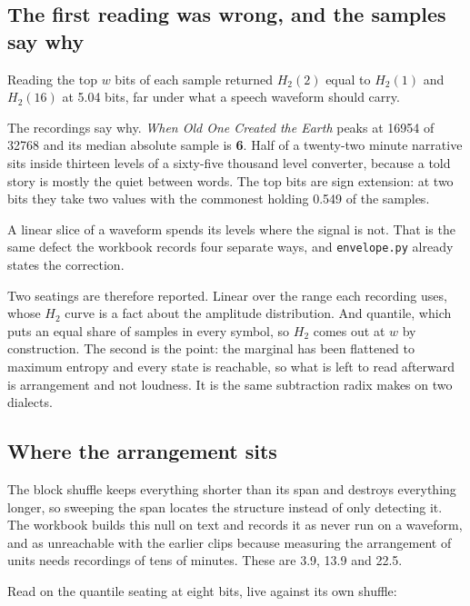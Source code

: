\subsection{The first reading was wrong, and the samples say why}

Reading the top \(w\) bits of each sample returned \(H_2(2)\) equal to \(H_2(1)\) and \(H_2(16)\) at
5.04 bits, far under what a speech waveform should carry.

The recordings say why. \emph{When Old One Created the Earth} peaks at 16954 of 32768 and its median
absolute sample is \textbf{6}. Half of a twenty-two minute narrative sits inside thirteen levels of a
sixty-five thousand level converter, because a told story is mostly the quiet between words. The top
bits are sign extension: at two bits they take two values with the commonest holding 0.549 of the
samples.

A linear slice of a waveform spends its levels where the signal is not. That is the same defect the
workbook records four separate ways, and \texttt{envelope.\allowbreak{}py} already states the
correction.

Two seatings are therefore reported. Linear over the range each recording uses, whose \(H_2\) curve
is a fact about the amplitude distribution. And quantile, which puts an equal share of samples in
every symbol, so \(H_2\) comes out at \(w\) by construction. The second is the point: the marginal
has been flattened to maximum entropy and every state is reachable, so what is left to read
afterward is arrangement and not loudness. It is the same subtraction radix makes on two dialects.

\subsection{Where the arrangement sits}

The block shuffle keeps everything shorter than its span and destroys everything longer, so sweeping
the span locates the structure instead of only detecting it. The workbook builds this null on text and
records it as never run on a waveform, and as unreachable with the earlier clips because measuring
the arrangement of units needs recordings of tens of minutes. These are 3.9, 13.9 and 22.5.

Read on the quantile seating at eight bits, live against its own shuffle:

